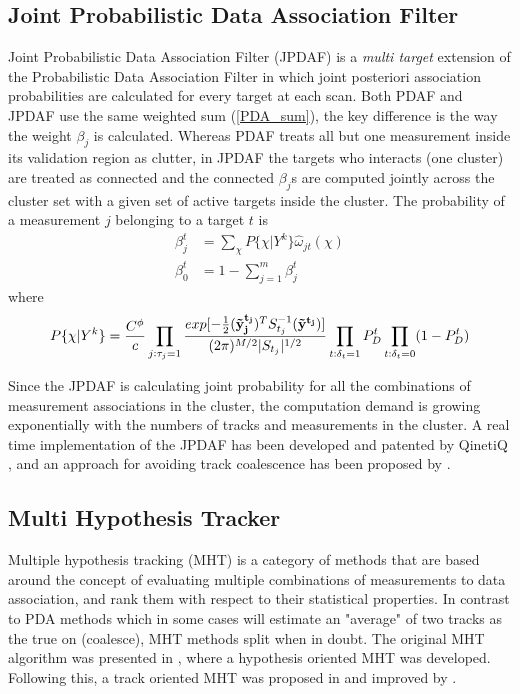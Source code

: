 \subsection{Joint Probabilistic Data Association Filter}
Joint Probabilistic Data Association Filter (JPDAF) is a \emph{multi target} extension of the Probabilistic Data Association Filter in which joint posteriori association probabilities are calculated for every target at each scan. Both PDAF and JPDAF use the same weighted sum (\ref{PDA_sum}), the key difference is the way the weight $ \beta_j $ is calculated. Whereas PDAF treats all but one measurement inside its validation region as clutter, in JPDAF the targets who interacts (one cluster) are treated as connected and the connected $ \beta_j $s are computed jointly across the cluster set with a given set of active targets inside the cluster. The probability of a measurement $j$ belonging to a target
$ t $ is \cite{Fortmann1983}
\begin{equation}
\begin{split}
\beta_j^t &= \sum_{\chi} P\{ \chi | Y^k \} \hat{\omega}_{jt}(\chi) \\
\beta_0^t &= 1 - \sum_{j=1}^m \beta_j^t
\end{split}
\end{equation}
where
\begin{equation}
P\{\chi|Y^k\} = \frac{C^\phi}{c} 
				\prod_{j:\tau_j=1} \frac{exp[-\frac{1}{2}(\boldsymbol{\mathbf{\tilde{y}_j^{t_j}}})^T S_{t_j}^{-1}(\boldsymbol{\mathbf{\tilde{y}^{t_j}}})]}{(2\pi)^{M/2} |S_{t_j}|^{1/2}}
				\prod_{t:\delta_t=1} P_D^t
				\prod_{t:\delta_t=0} (1 - P_D^t)
\end{equation}

Since the JPDAF is calculating joint probability for all the combinations of measurement associations in the cluster, the computation demand is growing exponentially with the numbers of tracks and measurements in the cluster. A real time implementation of the JPDAF has been developed and patented by QinetiQ \cite{QinetiQ2003}, and an approach for avoiding track coalescence has been proposed by \cite{Blom2000}.                                                   

\subsection{Multi Hypothesis Tracker}
Multiple hypothesis tracking (MHT) is a category of methods that are based around the concept of evaluating multiple  combinations of measurements to data association, and rank them with respect to their statistical properties. In contrast to PDA methods which in some cases will estimate an "average" of two tracks as the true on (coalesce), MHT methods split when in doubt. The original MHT algorithm was presented in \cite{Reid1978}, where a hypothesis oriented MHT was developed. Following this, a track oriented MHT was proposed in \cite{Kurien1990} and improved by \cite{Bar-Shalom2007}.

